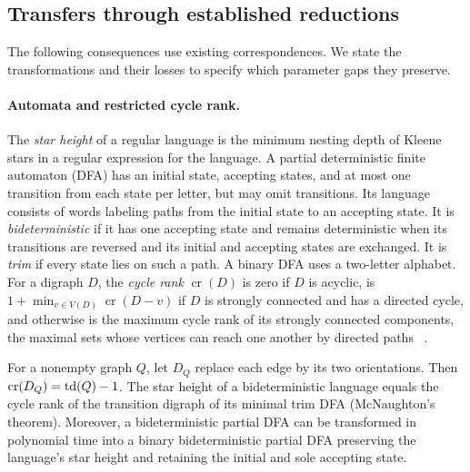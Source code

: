 \subsection{Transfers through established reductions}
\label{subsec:established-transfers}

The following consequences use existing correspondences. We state
the transformations and their losses to specify which parameter
gaps they preserve.

\paragraph{Automata and restricted cycle rank.}
The \emph{star height} of a regular language is the minimum nesting
depth of Kleene stars in a regular expression for the language.
A partial deterministic finite automaton (DFA) has an initial state,
accepting states, and at most one transition from each state per
letter, but may omit transitions. Its language consists of words labeling paths
from the initial state to an accepting state. It is
\emph{bideterministic} if it has one accepting state and remains
deterministic when its transitions are reversed and its initial and
accepting states are exchanged. It is \emph{trim} if every state lies
on such a path. A binary DFA uses a two-letter alphabet. For a digraph
$D$, the \emph{cycle rank} $\operatorname{cr}(D)$ is zero if $D$ is
acyclic, is $1+\min_{v\in V(D)}\operatorname{cr}(D-v)$ if $D$ is strongly
connected and has a directed cycle, and otherwise is the maximum
cycle rank of its strongly connected components, the maximal sets
whose vertices can reach one another by directed paths
~\cite[Sections~2--3]{Gruber2008}.

\begin{theorem}
\label{thm:cycle-rank-star-height}
For a nonempty graph $Q$, let $D_Q$ replace each edge by its two
orientations. Then $\operatorname{cr}(D_Q)=\operatorname{td}(Q)-1$.
The star height of a bideterministic language equals the cycle rank
of the transition digraph of its minimal trim DFA (McNaughton's theorem).
Moreover, a bideterministic partial DFA can be transformed in
polynomial time into a binary bideterministic partial DFA preserving
the language's star height and retaining the initial and sole
accepting state.
\end{theorem}

